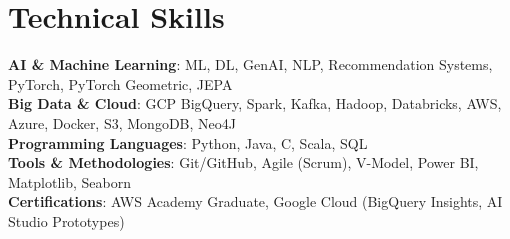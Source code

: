 \section{Technical Skills}
 \begin{itemize}[leftmargin=0.15in, label={}]
    \small{\item{
     \textbf{AI \& Machine Learning}{: ML, DL, GenAI, NLP, Recommendation Systems, PyTorch, PyTorch Geometric, JEPA} \\
     \textbf{Big Data \& Cloud}{: GCP BigQuery, Spark, Kafka, Hadoop, Databricks, AWS, Azure, Docker, S3, MongoDB, Neo4J} \\
     \textbf{Programming Languages}{: Python, Java, C, Scala, SQL} \\
     \textbf{Tools \& Methodologies}{: Git/GitHub, Agile (Scrum), V-Model, Power BI, Matplotlib, Seaborn} \\
     \textbf{Certifications}{: AWS Academy Graduate, Google Cloud (BigQuery Insights, AI Studio Prototypes)}
    }}
 \end{itemize}

